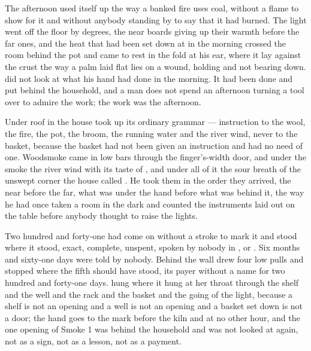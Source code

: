 The afternoon used itself up the way a banked fire uses coal, without a flame to show for it and without anybody standing by to say that it had burned. The light went off the floor by degrees, the near boards giving up their warmth before the far ones, and the heat that had been set down at  in the morning crossed the room behind the pot and came to rest in the fold at his ear, where it lay against the crust the way a palm laid flat lies on a wound, holding and not bearing down.  did not look at what his hand had done in the morning. It had been done and put behind the household, and a man does not spend an afternoon turning a tool over to admire the work; the work was the afternoon.

Under  roof in  the house took up its ordinary grammar --- instruction to the wool, the fire, the pot, the broom, the running water and the river wind, never to the basket, because the basket had not been given an instruction and had no need of one. Woodsmoke came in low bars through the finger's-width door, and under the smoke the river wind with its taste of , and under all of it the sour breath of the unswept corner the house called . He took them in the order they arrived, the near before the far, what was under the hand before what was behind it, the way he had once taken a room in the dark and counted the instruments laid out on the table before anybody thought to raise the lights.

Two hundred and forty-one had come on without a stroke to mark it and stood where it stood, exact, complete, unspent, spoken by nobody in ,  or . Six months and sixty-one days were told by nobody. Behind the wall  drew four low pulls and stopped where the fifth should have stood, its payer without a name for two hundred and forty-one days.  hung where it hung at her throat through the shelf and the well and the rack and the basket and the going of the light, because a shelf is not an opening and a well is not an opening and a basket set down is not a door; the hand goes to the mark before the kiln and at no other hour, and the one opening of Smoke 1 was behind the household and was not looked at again, not as a sign, not as a lesson, not as a payment.

